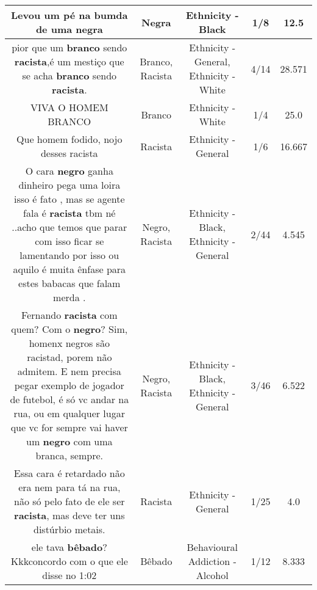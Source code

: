 \documentclass[11pt]{article}
\newlength\mylength
\begin{document}
\begin{center}
\begin{longtable}{|C{.65\mylength}|C{.30\mylength}|C{.12\mylength}|C{.12\mylength}|C{.12\mylength}|}
  \small Levou um pé na bumda de uma negra\normalsize   & Negra & Ethnicity - Black & 1/8 & 12.5 \\  \hline
  \small pior que um \textbf{branco} sendo \textbf{racista},é um mestiço que se acha \textbf{branco} sendo \textbf{racista}.\normalsize   & Branco, Racista & Ethnicity - General, Ethnicity - White & 4/14 & 28.571 \\  \hline
  \small VIVA O HOMEM BRANCO\normalsize   & Branco & Ethnicity - White & 1/4 & 25.0 \\  \hline
  \small Que homem fodido, nojo desses racista\normalsize   & Racista & Ethnicity - General & 1/6 & 16.667 \\  \hline
  \small O cara \textbf{negro} ganha dinheiro pega uma loira isso é fato  , mas se agente fala é \textbf{racista} tbm né ..acho que temos que parar com isso ficar se lamentando por isso ou aquilo  é muita ênfase para estes babacas que falam merda .\normalsize   & Negro, Racista & Ethnicity - Black, Ethnicity - General & 2/44 & 4.545 \\  \hline
  \small Fernando \textbf{racista} com quem? Com o \textbf{negro}? Sim, homenx negros são racistad, porem não admitem. E nem precisa pegar exemplo de jogador de futebol, é só vc andar na rua, ou em qualquer lugar que vc for sempre vai haver um \textbf{negro} com uma branca, sempre.\normalsize   & Negro, Racista & Ethnicity - Black, Ethnicity - General & 3/46 & 6.522 \\  \hline
  \small Essa cara é retardado não era nem para tá na rua,  não  só pelo fato de ele ser \textbf{racista},  mas deve ter uns distúrbio metais.\normalsize   & Racista & Ethnicity - General & 1/25 & 4.0 \\  \hline
  \small ele tava \textbf{bêbado}? Kkkconcordo com o que ele disse no 1:02\normalsize   & Bêbado & Behavioural Addiction - Alcohol & 1/12 & 8.333 \\  \hline

\end{longtable}
\end{center}
\end{document}
